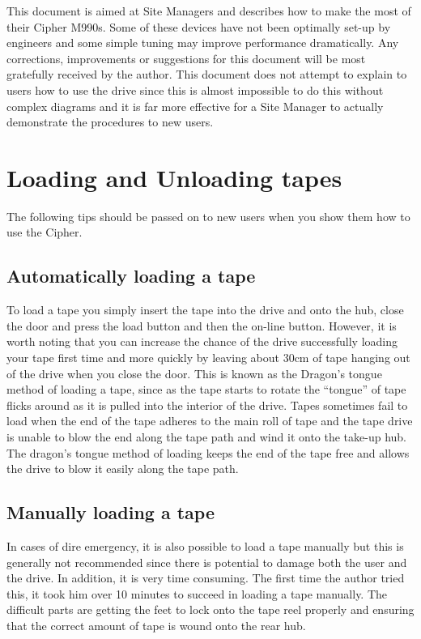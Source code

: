 This document is aimed at Site Managers and describes how to make the most of
their Cipher M990s. Some of these devices have not been optimally set-up by
engineers and some simple tuning may improve performance dramatically.
Any corrections, improvements or suggestions for this document will be most
gratefully received by the author. This document does not attempt to explain
to users how to use the drive since this is almost impossible to do this
without complex diagrams and it is far more effective for a Site Manager to 
actually demonstrate the procedures to new users. 
              

\section{Loading and Unloading tapes}

The following tips should be passed on to new users when you show them
how to use the Cipher.

\subsection{Automatically loading a tape}

To load a tape you simply insert the tape into the drive and onto the hub,
close the door and press the load button and then the on-line button.  However,
it is worth noting that you can increase the chance of the drive successfully
loading your tape first time and more quickly by leaving about 30cm of tape 
hanging out of the drive when you close the door. This is known  as the
Dragon's tongue method of loading a tape, since as the tape starts to  rotate
the ``tongue'' of tape flicks around as it is pulled into the  interior of the
drive. Tapes sometimes fail to load when the end of the tape adheres to the
main roll of tape and the tape drive is unable to  blow the end along the tape
path and wind it onto the take-up hub. The dragon's tongue method of loading
keeps the end of the tape free and allows the drive to blow it easily along the
tape path.

\subsection {Manually loading a tape}

In cases of dire emergency, it is also possible to load a tape manually but
this is generally not recommended since there is potential to damage both the 
user and the drive. In addition, it is very time consuming. The first time the
author tried this, it took him over 10 minutes to succeed in loading a tape
manually. The difficult parts are getting the feet to lock onto the tape 
reel properly and
ensuring that the correct amount of tape is wound onto the rear hub.

